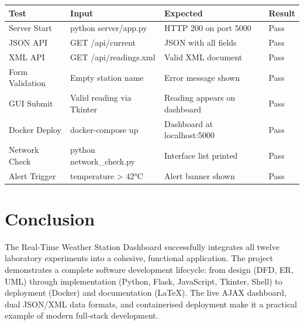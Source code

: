 \documentclass[12pt,a4paper]{article}
\begin{document}
\begin{center}
\begin{tabular}{llll}
\toprule
\textbf{Test} & \textbf{Input} & \textbf{Expected} & \textbf{Result} \\
\midrule
Server Start & python server/app.py & HTTP 200 on port 5000 & \textcolor{green!60!black}{Pass} \\
JSON API & GET /api/current & JSON with all fields & \textcolor{green!60!black}{Pass} \\
XML API & GET /api/readings.xml & Valid XML document & \textcolor{green!60!black}{Pass} \\
Form Validation & Empty station name & Error message shown & \textcolor{green!60!black}{Pass} \\
GUI Submit & Valid reading via Tkinter & Reading appears on dashboard & \textcolor{green!60!black}{Pass} \\
Docker Deploy & docker-compose up & Dashboard at localhost:5000 & \textcolor{green!60!black}{Pass} \\
Network Check & python network\_check.py & Interface list printed & \textcolor{green!60!black}{Pass} \\
Alert Trigger & temperature > 42°C & Alert banner shown & \textcolor{green!60!black}{Pass} \\
\bottomrule
\end{tabular}
\end{center}

\section{Conclusion}
The Real-Time Weather Station Dashboard successfully integrates all twelve laboratory experiments into a cohesive, functional application. The project demonstrates a complete software development lifecycle: from design (DFD, ER, UML) through implementation (Python, Flask, JavaScript, Tkinter, Shell) to deployment (Docker) and documentation (\LaTeX). The live AJAX dashboard, dual JSON/XML data formats, and containerised deployment make it a practical example of modern full-stack development.
\end{document}
